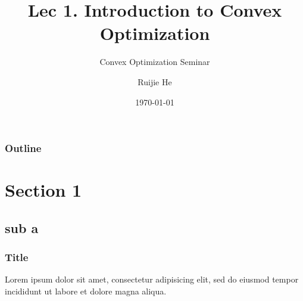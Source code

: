 \documentclass{beamer}
\title{Lec 1. Introduction to Convex Optimization}
\subtitle{Convex Optimization Seminar}
\author{Ruijie He}
\institute{Tongji University}
\date{\today}
\begin{document}
\begin{frame}
\titlepage
\end{frame}

\begin{frame}
\frametitle{Outline}
\tableofcontents
\end{frame}

\section{Section 1}
\subsection{sub a}

\begin{frame}
\frametitle{Title}
Lorem ipsum dolor sit amet, consectetur adipisicing elit, sed do eiusmod tempor incididunt ut labore et dolore magna aliqua.
\end{frame}
\end{document}
